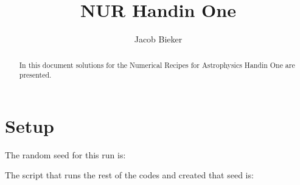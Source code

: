 \documentclass[a4paper,10pt]{article}
\title{NUR Handin One}
\author{Jacob Bieker}
\begin{document}
\maketitle

\begin{abstract}
 In this document solutions for the Numerical Recipes for Astrophysics Handin One are presented.
\end{abstract}

\section{Setup}

The random seed for this run is:



The script that runs the rest of the codes and created that seed is:


















\end{document}
